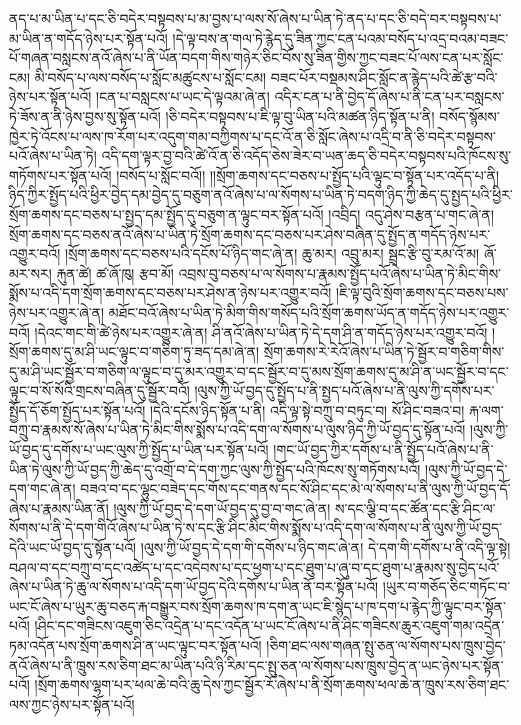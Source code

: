ནད་པ་མ་ཡིན་པ་དང་ཅི་བདེར་བསྟབས་པ་མ་བྱས་པ་ལས་སོ་ཞེས་པ་ཡིན་ཏེ་ནད་པ་དང་ཅི་བདེ་བར་བསྟབས་པ་མ་ཡིན་ན་གདོད་ཉེས་པར་སྟོན་པའོ། །དེ་ལྟ་བས་ན་གལ་ཏེ་རྙེད་དུ་ཟིན་ཀྱང་ངན་པའམ་བསོད་པ་འདྲ་བའམ་བཟང་པོ་གཞན་བསླངས་ནའོ་ཞེས་པ་ནི་ཡོན་བདག་གིས་གཉེར་ཅིང་བོས་སུ་ཟིན་གྱིས་ཀྱང་བཟང་པོ་ལས་ངན་པར་སློང་ངམ། མི་བསོད་པ་ལས་བསོད་པ་སློང་མཚུངས་པ་སློང་ངམ། བཟང་པོར་བསྡམས་ཤིང་སློང་ན་རྙེད་པའི་ཚེ་རྩ་བའི་ཉེས་པར་སྟོན་པའོ། །ངན་པ་བསླངས་པ་ཡང་དེ་ལྟའམ་ཞེ་ན། འདིར་ངན་པ་ནི་བྱེད་དོ་ཞེས་པ་ནི་ངན་པར་བསླངས་ཏེ་ཟོས་ན་ནི་ཉེས་བྱས་སུ་སྟོན་པའོ། །ཅི་བདེར་བསྟབས་པ་ཇི་ལྟ་བུ་ཡིན་པའི་མཚན་ཉིད་སྟོན་པ་ནི། བསོད་སྙོམས་ཁྱེར་ཏེ་འོངས་པ་ལས་ཁ་རོག་པར་འདུག་གམ་བཀྱིགས་པ་དང་འོ་ན་ཅི་སློང་ཞེས་པ་འདྲི་བ་ནི་ཅི་བདེར་བསྟབས་པའོ་ཞེས་པ་ཡིན་ཏེ། འདི་དག་ལྟར་བྱ་བའི་ཚེ་འོ་ན་ཅི་འདོད་ཅེས་ཟེར་བ་ཡན་ཆད་ཅི་བདེར་བསྟབས་པའི་ཁོངས་སུ་གཏོགས་པར་སྟོན་པའོ། །བསོད་པ་སློང་བའོ།། །།སྲོག་ཆགས་དང་བཅས་པ་སྤྱོད་པའི་ལྟུང་བ་སྟོན་པར་འདོད་པ་ནི། ཉིད་ཀྱིར་སྤྱོད་པའི་ཕྱིར་བྱེད་དམ་བྱེད་དུ་བཅུག་ནའོ་ཞེས་པ་ལ་སོགས་པ་ཡིན་ཏེ་བདག་ཉིད་ཀྱི་ཆེད་དུ་སྤྱད་པའི་ཕྱིར་སྲོག་ཆགས་དང་བཅས་པ་སྤྱད་དམ་སྤྱོད་དུ་བཅུག་ན་ལྟུང་བར་སྟོན་པའོ། །འབྲིད། འདུ་ཤེས་བརྩན་པ་གང་ཞེ་ན། སྲོག་ཆགས་དང་བཅས་ནའོ་ཞེས་པ་ཡིན་ཏེ་སྲོག་ཆགས་དང་བཅས་པར་ཤེས་བཞིན་དུ་སྤྱོད་ན་གདོད་ཉེས་པར་འགྱུར་བའོ། །སྲོག་ཆགས་དང་བཅས་པའི་དངོས་པོ་ཉིད་གང་ཞེ་ན། ཆུ་མར། འབྲུ་མར། སྦྲང་རྩི་བུ་རམ་འོ་མ། ཞོ་མར་སར། རྐུན་ཚེ། ཚ་ཞོ་ཁུ། རྩབ་མོ། འབྲས་བུ་བཅས་པ་ལ་སོགས་པ་རྣམས་སྤྱོད་པའོ་ཞེས་པ་ཡིན་ཏེ་མིང་གིས་སྨོས་པ་འདི་དག་སྲོག་ཆགས་དང་བཅས་པར་ཤེས་ན་ཉེས་པར་འགྱུར་བའོ། །ཇི་ལྟ་བུའི་སྲོག་ཆགས་དང་བཅས་པས་ཉེས་པར་འགྱུར་ཞེ་ན། མཐོང་བའོ་ཞེས་པ་ཡིན་ཏེ་མིག་གིས་གསོད་པའི་སྲོག་ཆགས་ཡོད་ན་གདོད་ཉེས་པར་འགྱུར་བའོ། །དེའང་གང་གི་ཚེ་ཉེས་པར་འགྱུར་ཞེ་ན། ཤི་ནའོ་ཞེས་པ་ཡིན་ཏེ་དེ་དག་ཤི་ན་གདོད་ཉེས་པར་འགྱུར་བའོ། །སྲོག་ཆགས་དུ་མ་ཤི་ཡང་ལྟུང་བ་གཅིག་ཏུ་ཟད་དམ་ཞེ་ན། སྲོག་ཆགས་རེ་རེའོ་ཞེས་པ་ཡིན་ཏེ་སྦྱོར་བ་གཅིག་གིས་དུ་མ་ཤི་ཡང་སྦྱོར་བ་གཅིག་ལ་ལྟུང་བ་དུ་མར་འགྱུར་བ་དང་སྦྱོར་བ་དུ་མས་སྲོག་ཆགས་དུ་མ་ཤི་ན་ཡང་སྦྱོར་བ་དང་ལྟུང་བ་སོ་སོའི་གྲངས་བཞིན་དུ་སྦྱོར་བའོ། །ལུས་ཀྱི་ཡོ་བྱད་དུ་སྤྱོད་པ་ནི་སྤྱད་པའོ་ཞེས་པ་ནི་ལུས་ཀྱི་དགོས་པར་སྤྱོད་དོ་ཅོག་སྤྱོད་པར་སྟོན་པའོ། །དེའི་དངོས་ཉིད་སྟོན་པ་ནི། འདི་ལྟ་སྟེ་བཀྲུ་བ་བཏུང་བ། སོ་ཤིང་བཟའ་བ། རྐ་ལག་བཀྲུ་བ་རྣམས་སོ་ཞེས་པ་ཡིན་ཏེ་མིང་གིས་སྨོས་པ་འདི་དག་ལ་སོགས་པ་ལུས་ཉིད་ཀྱི་ཡོ་བྱད་དུ་སྟོན་པའོ། །ལུས་ཀྱི་ཡོ་བྱད་དུ་དགོས་པ་ཡང་ལུས་ཀྱི་སྤྱོད་པ་ཡིན་པར་སྟོན་པའོ། །གང་ཡོ་བྱད་ཀྱིར་དགོས་པ་ནི་སྤྱོད་པའོ་ཞེས་པ་ནི་ཡིན་ཏེ་ལུས་ཀྱི་ཡོ་བྱད་ཀྱི་ཆེད་དུ་འགྲོ་བ་དེ་དག་ཀྱང་ལུས་ཀྱི་སྤྱོད་པའི་ཁོངས་སུ་གཏོགས་པའོ། །ལུས་ཀྱི་ཡོ་བྱད་དེ་དག་གང་ཞེ་ན། བཟའ་བ་དང་ལྷུང་བཟེད་དང་གོས་དང་གནས་དང་སོ་ཤིང་དང་མེ་ལ་སོགས་པ་ནི་ལུས་ཀྱི་ཡོ་བྱད་དོ་ཞེས་པ་རྣམས་ཡིན་ནོ། །ལུས་ཀྱི་ཡོ་བྱད་དེ་དག་ཡོ་བྱད་དུ་བྱ་བ་གང་ཞེ་ན། ས་དང་ལྕི་བ་དང་ཚོན་དང་རྩི་ཤིང་ལ་སོགས་པ་ནི་དེ་དག་གིའོ་ཞེས་པ་ཡིན་ཏེ་ས་དང་རྩི་ཤིང་མིང་གིས་སྨོས་པ་འདི་དག་ལ་སོགས་པ་ནི་ལུས་ཀྱི་ཡོ་བྱད་དེའི་ཡང་ཡོ་བྱད་དུ་སྟོན་པའོ། །ལུས་ཀྱི་ཡོ་བྱད་དེ་དག་གི་དགོས་པ་ཉིད་གང་ཞེ་ན། དེ་དག་གི་དགོས་པ་ནི་འདི་ལྟ་སྟེ། བཤལ་བ་དང་བཀྲུ་བ་དང་འཚེད་པ་དང་འདེབས་པ་དང་ཕྱག་པ་དང་ཐུག་པ་ཞུ་བ་དང་ཐུག་པ་རྣམས་སུ་བྱེད་པའོ་ཞེས་པ་ཡིན་ཏེ་ཆུ་ལ་སོགས་པ་འདི་དག་ཡོ་བྱད་དེའི་དགོས་པ་ཡིན་ནོ་བར་སྟོན་པའོ། །ཡུར་བ་གཅོད་ཅིང་གཏོང་བ་ཡང་ངོ་ཞེས་པ་ཡུར་ཆུ་བཅད་རྐ་བསྒྱུར་བས་སྲོག་ཆགས་ཁ་དག་ན་ཡང་ཇི་སྙེད་པ་ཁ་དག་པ་རྙེད་ཀྱི་ལྟུང་བར་སྟོན་པའོ། །ཤིང་དང་གཟིངས་འཇུག་ཅིང་འདྲེན་པ་དང་འདོན་པ་ཡང་ངོ་ཞེས་པ་ནི་ཤིང་གཟིངས་ཆུར་འཇུག་གམ་འདྲེན་ཏམ་འདོན་པས་སྲོག་ཆགས་ཤི་ན་ཡང་ལྟུང་བར་སྟོན་པའོ། །ཅིག་ཐང་ལས་གཞན་སྤུ་ཅན་ལ་སོགས་པས་ཁྲུས་བྱེད་ནའོ་ཞེས་པ་ནི་ཁྲུས་རས་ཅིག་ཐང་མ་ཡིན་པའི་ཉི་རིམ་དང་སྤུ་ཅན་ལ་སོགས་པས་ཁྲུས་བྱེད་ན་ཡང་ཉེས་པར་སྟོན་པའོ། །སྲོག་ཆགས་ལྷག་པར་ཕལ་ཆེ་བའི་ཆུ་དེས་ཀྱང་སྦྱོར་རོ་ཞེས་པ་ནི་སྲོག་ཆགས་ཕལ་ཆེ་ན་ཁྲུས་རས་ཅིག་ཐང་ལས་ཀྱང་ཉེས་པར་སྟོན་པའོ། 